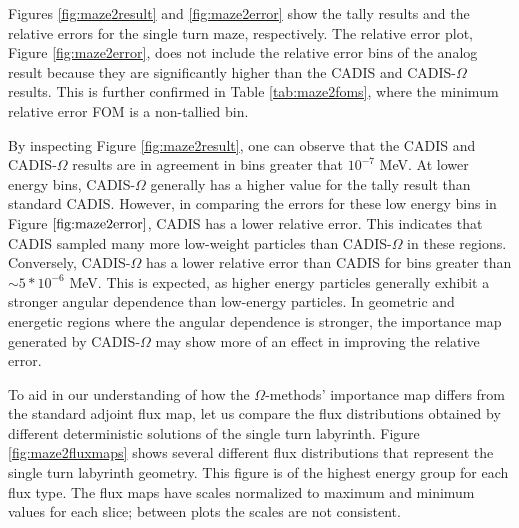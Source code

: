 Figures \ref{fig:maze2result} and \ref{fig:maze2error} show the tally results and
the relative errors for the single turn maze, respectively.
The relative error plot,
Figure \ref{fig:maze2error}, does not include the
relative error bins of the analog result because they are significantly higher
than the CADIS and CADIS-$\Omega$ results. This is further confirmed in Table
\ref{tab:maze2foms}, where the minimum relative error FOM is a non-tallied bin.

By inspecting Figure \ref{fig:maze2result}, one can observe that the CADIS and
CADIS-$\Omega$ results are in agreement in bins greater that $10^{-7}$ MeV. At
lower energy bins, CADIS-$\Omega$ generally has a higher value for the tally
result than standard CADIS. However, in comparing the errors for these low energy
bins in Figure $\ref{fig:maze2error}$, CADIS has a lower relative error. This
indicates that CADIS sampled many more low-weight particles than CADIS-$\Omega$
in these regions. Conversely, CADIS-$\Omega$ has a lower relative
error than CADIS for bins greater than $\sim5*10^{-6}$ MeV. This is expected, as
higher energy particles generally exhibit a stronger angular dependence than
low-energy particles. In geometric and energetic regions
where the angular dependence is stronger,
the importance map generated by CADIS-$\Omega$ may show more of an effect in
improving the relative error.

To aid in our understanding of how the $\Omega$-methods' importance map differs
from the standard adjoint flux map, let us compare the flux distributions
obtained by different deterministic solutions of the single turn labyrinth.
Figure \ref{fig:maze2fluxmaps} shows several different flux distributions that
represent the single turn labyrinth geometry. This figure is of the highest
energy group for each flux type. The flux maps have scales normalized to maximum and minimum values
  for each slice; between plots the scales are not consistent. 


